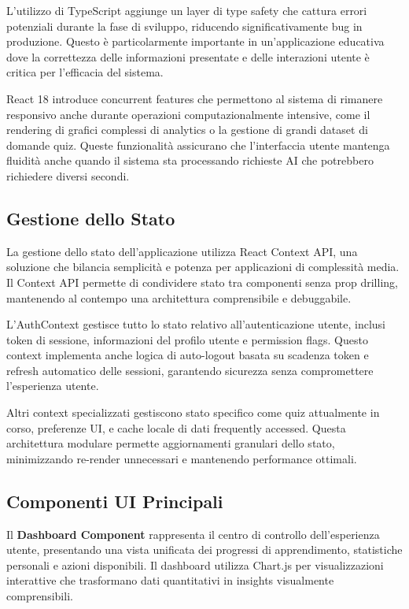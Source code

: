 \documentclass[12pt,a4paper]{article}
\begin{document}
L'utilizzo di TypeScript aggiunge un layer di type safety che cattura errori potenziali durante la fase di sviluppo, riducendo significativamente bug in produzione. Questo è particolarmente importante in un'applicazione educativa dove la correttezza delle informazioni presentate e delle interazioni utente è critica per l'efficacia del sistema.

React 18 introduce concurrent features che permettono al sistema di rimanere responsivo anche durante operazioni computazionalmente intensive, come il rendering di grafici complessi di analytics o la gestione di grandi dataset di domande quiz. Queste funzionalità assicurano che l'interfaccia utente mantenga fluidità anche quando il sistema sta processando richieste AI che potrebbero richiedere diversi secondi.

\subsection{Gestione dello Stato}

La gestione dello stato dell'applicazione utilizza React Context API, una soluzione che bilancia semplicità e potenza per applicazioni di complessità media. Il Context API permette di condividere stato tra componenti senza prop drilling, mantenendo al contempo una architettura comprensibile e debuggabile.

L'AuthContext gestisce tutto lo stato relativo all'autenticazione utente, inclusi token di sessione, informazioni del profilo utente e permission flags. Questo context implementa anche logica di auto-logout basata su scadenza token e refresh automatico delle sessioni, garantendo sicurezza senza compromettere l'esperienza utente.

Altri context specializzati gestiscono stato specifico come quiz attualmente in corso, preferenze UI, e cache locale di dati frequently accessed. Questa architettura modulare permette aggiornamenti granulari dello stato, minimizzando re-render unnecessari e mantenendo performance ottimali.

\subsection{Componenti UI Principali}

Il \textbf{Dashboard Component} rappresenta il centro di controllo dell'esperienza utente, presentando una vista unificata dei progressi di apprendimento, statistiche personali e azioni disponibili. Il dashboard utilizza Chart.js per visualizzazioni interattive che trasformano dati quantitativi in insights visualmente comprensibili.
\end{document}
